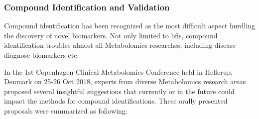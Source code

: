 \subsubsection{Compound Identification and Validation}
Compound identification has been recognized as the most difficult aspect hurdling the discovery of novel biomarkers. Not only limited to \acrshort{bfis}, compound identification troubles almost all Metabolomics researches, including disease diagnose biomarkers etc.

In the 1st Copenhagen Clinical Metabolomics Conference held in Hellerup, Denmark on 25-26 Oct 2018, experts from diverse Metabolomics research areas proposed several insightful suggestions that currently or in the future could impact the methods for compound identifications. These orally presented proposals were summarized as following:

